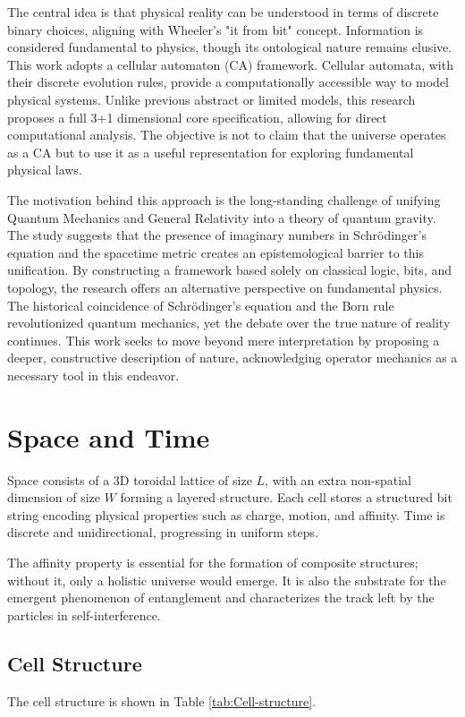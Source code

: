 \documentclass[12pt]{article}
\begin{document}
The central idea is that physical reality can be understood in terms of discrete binary choices, aligning with Wheeler's "it from bit" concept. Information is considered fundamental to physics, though its ontological nature remains elusive. This work adopts a cellular automaton (CA) framework. Cellular automata, with their discrete evolution rules, provide a computationally accessible way to model physical systems. Unlike previous abstract or limited models, this research proposes a full 3+1 dimensional core specification, allowing for direct computational analysis. The objective is not to claim that the universe operates as a CA but to use it as a useful representation for exploring fundamental physical laws.

The motivation behind this approach is the long-standing challenge of unifying Quantum Mechanics and General Relativity into a theory of quantum gravity. The study suggests that the presence of imaginary numbers in Schrödinger’s equation and the spacetime metric creates an epistemological barrier to this unification. By constructing a framework based solely on classical logic, bits, and topology, the research offers an alternative perspective on fundamental physics. The historical coincidence of Schrödinger’s equation and the Born rule revolutionized quantum mechanics, yet the debate over the true nature of reality continues. This work seeks to move beyond mere interpretation by proposing a deeper, constructive description of nature, acknowledging operator mechanics as a necessary tool in this endeavor.

\section{Space and Time}
Space consists of a 3D toroidal lattice of size $L$, with an extra non-spatial dimension of size $W$ forming a layered structure. Each cell stores a structured bit string encoding physical properties such as charge, motion, and affinity. Time is discrete and unidirectional, progressing in uniform steps.

The affinity property is essential for the formation of composite structures; without it, only a holistic universe would emerge. It is also the substrate for the emergent phenomenon of entanglement and characterizes the track left by the particles in self-interference.

\subsection{Cell Structure}
The cell structure is shown in Table \ref{tab:Cell-structure}.
\end{document}

